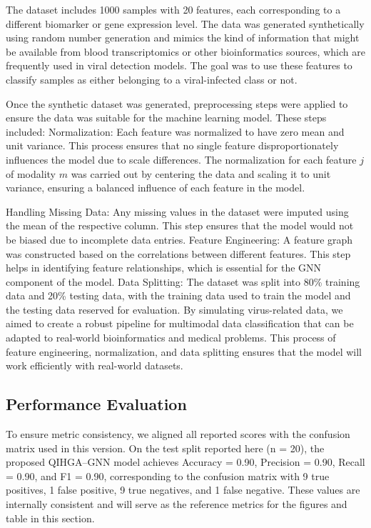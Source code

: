 \documentclass[11pt,a4paper]{article}
\begin{document}
The dataset includes 1000 samples with 20 features, each corresponding to a different biomarker or gene expression level. The data was generated synthetically using random number generation and mimics the kind of information that might be available from blood transcriptomics or other bioinformatics sources, which are frequently used in viral detection models. The goal was to use these features to classify samples as either belonging to a viral-infected class or not.

Once the synthetic dataset was generated, preprocessing steps were applied to ensure the data was suitable for the machine learning model. These steps included: Normalization: Each feature was normalized to have zero mean and unit variance. This process ensures that no single feature disproportionately influences the model due to scale differences. The normalization for each feature $j$ of modality $m$ was carried out by centering the data and scaling it to unit variance, ensuring a balanced influence of each feature in the model.

Handling Missing Data: Any missing values in the dataset were imputed using the mean of the respective column. This step ensures that the model would not be biased due to incomplete data entries. Feature Engineering: A feature graph was constructed based on the correlations between different features. This step helps in identifying feature relationships, which is essential for the GNN component of the model. Data Splitting: The dataset was split into 80\% training data and 20\% testing data, with the training data used to train the model and the testing data reserved for evaluation. By simulating virus-related data, we aimed to create a robust pipeline for multimodal data classification that can be adapted to real-world bioinformatics and medical problems. This process of feature engineering, normalization, and data splitting ensures that the model will work efficiently with real-world datasets.

\subsection{Performance Evaluation}
To ensure metric consistency, we aligned all reported scores with the confusion matrix used in this version. On the test split reported here (n = 20), the proposed QIHGA--GNN model achieves Accuracy = 0.90, Precision = 0.90, Recall = 0.90, and F1 = 0.90, corresponding to the confusion matrix with 9 true positives, 1 false positive, 9 true negatives, and 1 false negative. These values are internally consistent and will serve as the reference metrics for the figures and table in this section.
\end{document}
